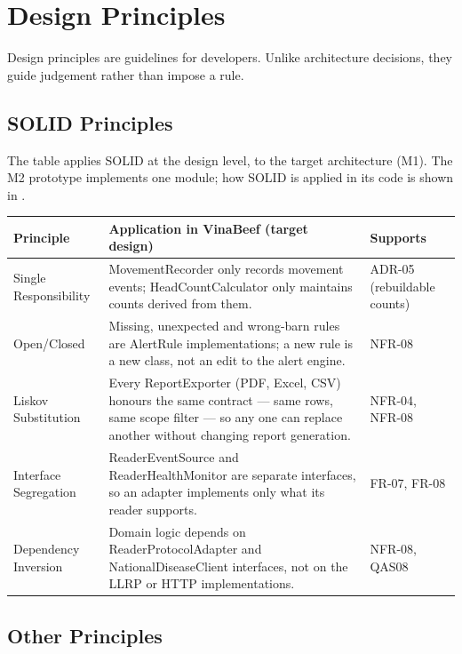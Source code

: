 \section{Design Principles}\label{sec:6}

Design principles are guidelines for developers. Unlike architecture
decisions, they guide judgement rather than impose a rule.

\subsection{SOLID Principles}\label{sec:6.1}

The table applies SOLID at the design level, to the target architecture
(M1). The M2 prototype implements one module; how SOLID is applied in its
code is shown in .

{\small
\begin{longtable}[]{|>{\raggedright\arraybackslash}p{}|>{\raggedright\arraybackslash}p{}|>{\raggedright\arraybackslash}p{}|}
\hline
\textbf{Principle} & \textbf{Application in VinaBeef (target design)} & \textbf{Supports} \\ \hline
\endhead
Single Responsibility & MovementRecorder only records movement events;
HeadCountCalculator only maintains counts derived from them. & ADR-05
(rebuildable counts) \\ \hline
Open/Closed & Missing, unexpected and wrong-barn rules are AlertRule
implementations; a new rule is a new class, not an edit to the alert
engine. & NFR-08 \\ \hline
Liskov Substitution & Every ReportExporter (PDF, Excel, CSV) honours the
same contract --- same rows, same scope filter --- so any one can
replace another without changing report generation. & NFR-04, NFR-08 \\ \hline
Interface Segregation & ReaderEventSource and ReaderHealthMonitor are
separate interfaces, so an adapter implements only what its reader
supports. & FR-07, FR-08 \\ \hline
Dependency Inversion & Domain logic depends on ReaderProtocolAdapter and
NationalDiseaseClient interfaces, not on the LLRP or HTTP
implementations. & NFR-08, QAS08 \\ \hline
\end{longtable}
}

\subsection{Other Principles}\label{sec:6.2}


